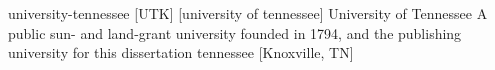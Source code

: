 \newglsXinstitution%
{university-tennessee}%
[UTK]%
[university of tennessee]%
{University of Tennessee}%
{A public sun{\--} and land{\--}grant university founded in 1794, and the publishing university for this dissertation \cite{website:University_of_Tennessee}}%
{tennessee}%
[Knoxville, TN]%